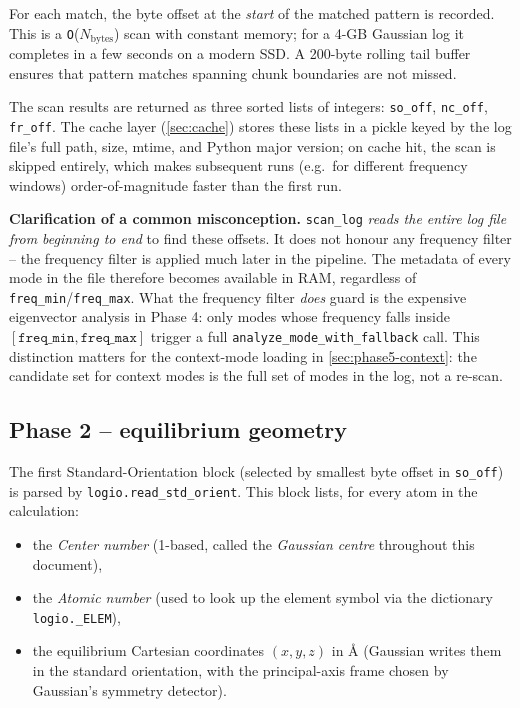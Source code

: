 \documentclass[10pt,a4paper,twoside]{article}
\newcommand{\codref}[1]{%
  \quad\text{\textcolor{gray!70!black}{\footnotesize $\rightsquigarrow$~\texttt{#1}}}}
\newcommand{\fn}[1]{\texttt{#1}}
\newcommand{\cfgkey}[1]{\texttt{#1}}
\begin{document}
For each match, the byte offset at the \emph{start} of the matched
pattern is recorded. This is a \texttt{O}($N_\text{bytes}$) scan with
constant memory; for a 4-GB Gaussian log it completes in a few seconds
on a modern SSD. A 200-byte rolling tail buffer ensures that pattern
matches spanning chunk boundaries are not missed.

The scan results are returned as three sorted lists of integers:
\fn{so\_off}, \fn{nc\_off}, \fn{fr\_off}. The cache layer
(\cref{sec:cache}) stores these lists in a pickle keyed by the log
file's full path, size, mtime, and Python major version; on cache
hit, the scan is skipped entirely, which makes subsequent runs
(e.g.\ for different frequency windows) order-of-magnitude faster
than the first run.

\begin{infobox}
\textbf{Clarification of a common misconception.}
\fn{scan\_log} \emph{reads the entire log file from beginning to end}
to find these offsets. It does not honour any frequency filter --
the frequency filter is applied much later in the pipeline. The
metadata of every mode in the file therefore becomes available in
RAM, regardless of \cfgkey{freq\_min}/\cfgkey{freq\_max}. What the
frequency filter \emph{does} guard is the expensive eigenvector
analysis in Phase 4: only modes whose frequency falls inside
$[\cfgkey{freq\_min}, \cfgkey{freq\_max}]$ trigger a full
\fn{analyze\_mode\_with\_fallback} call. This distinction matters for
the context-mode loading in
\cref{sec:phase5-context}: the candidate set for context modes is
the full set of modes in the log, not a re-scan.
\end{infobox}

\subsection{Phase 2 -- equilibrium geometry}
\label{sec:phase2-geom}

\codref{logio.read\_std\_orient}

The first Standard-Orientation block (selected by smallest byte
offset in \fn{so\_off}) is parsed by \fn{logio.read\_std\_orient}.
This block lists, for every atom in the calculation:

\begin{itemize}
  \item the \emph{Center number} (1-based, called the \emph{Gaussian
        centre} throughout this document),
  \item the \emph{Atomic number} (used to look up the element symbol
        via the dictionary \fn{logio.\_ELEM}),
  \item the equilibrium Cartesian coordinates $(x, y, z)$ in \AA{}
        (Gaussian writes them in the standard orientation, with the
        principal-axis frame chosen by Gaussian's symmetry detector).
\end{itemize}
\end{document}
